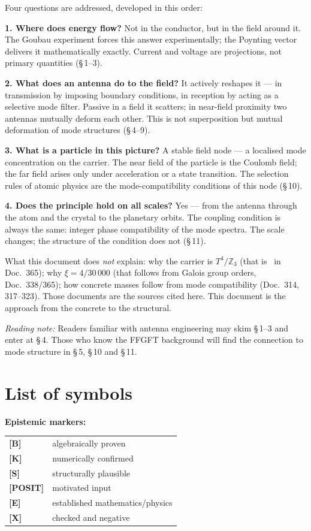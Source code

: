 Four questions are addressed, developed in this order:

\textbf{1. Where does energy flow?} Not in the conductor, but in the field
around it. The Goubau experiment forces this answer experimentally; the
Poynting vector delivers it mathematically exactly. Current and voltage
are projections, not primary quantities (\S\,1--3).

\textbf{2. What does an antenna do to the field?} It actively reshapes
it --- in transmission by imposing boundary conditions, in reception by
acting as a selective mode filter. Passive in a field it scatters; in
near-field proximity two antennas mutually deform each other. This is
not superposition but mutual deformation of mode structures (\S\,4--9).

\textbf{3. What is a particle in this picture?} A stable field node ---
a localised mode concentration on the carrier. The near field of the
particle is the Coulomb field; the far field arises only under
acceleration or a state transition. The selection rules of atomic
physics are the mode-compatibility conditions of this node (\S\,10).

\textbf{4. Does the principle hold on all scales?} Yes --- from the
antenna through the atom and the crystal to the planetary orbits. The
coupling condition is always the same: integer phase compatibility of
the mode spectra. The scale changes; the structure of the condition
does not (\S\,11).

What this document does \emph{not} explain: why the carrier is
$T^4/\mathbb{Z}_3$ (that is \SetzM\ in Doc.~365); why $\xi = 4/30\,000$
(that follows from Galois group orders, Doc.~338/365); how concrete
masses follow from mode compatibility (Doc.~314, 317--323). Those
documents are the sources cited here. This document is the approach
from the concrete to the structural.

\vspace{0.5em}
\noindent
\textit{Reading note:} Readers familiar with antenna engineering may skim
\S\,1--3 and enter at \S\,4. Those who know the FFGFT background will find
the connection to mode structure in \S\,5, \S\,10 and \S\,11.

\section*{List of symbols}

\medskip
\textbf{Epistemic markers:}
\begin{tabular}{@{}lp{4.5cm}@{}}
\textbf{[B]} & algebraically proven \\
\textbf{[K]} & numerically confirmed \\
\textbf{[S]} & structurally plausible \\
\textbf{[POSIT]} & motivated input \\
\textbf{[E]} & established mathematics/physics \\
\textbf{[X]} & checked and negative \\
\end{tabular}

